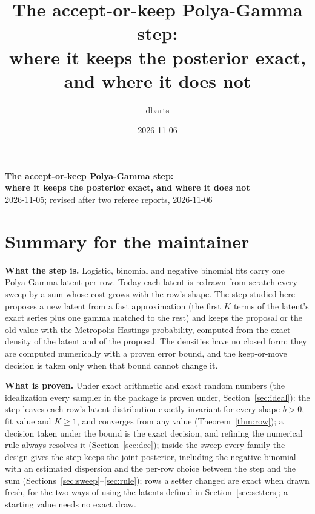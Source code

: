 \documentclass[11pt]{article}
\title{The accept-or-keep Polya-Gamma step:\\ where it keeps the posterior exact, and where it does not}
\author{dbarts}
\date{2026-11-06}
\theoremstyle{definition}
\begin{document}
\begin{center}
{\Large\bfseries The accept-or-keep Polya-Gamma step:\\[2pt] where it keeps the posterior exact, and where it does
not}\\[4pt]
2026-11-05; revised after two referee reports, 2026-11-06
\end{center}

\section*{Summary for the maintainer}

\textbf{What the step is.} Logistic, binomial and negative binomial fits carry one Polya-Gamma latent per row.
Today each latent is redrawn from scratch every sweep by a sum whose cost grows with the row's shape. The step
studied here proposes a new latent from a fast approximation (the first $K$ terms of the latent's exact series
plus one gamma matched to the rest) and keeps the proposal or the old value with the Metropolis-Hastings
probability, computed from the exact density of the latent and of the proposal. The densities have no closed
form; they are computed numerically with a proven error bound, and the keep-or-move decision is taken only when
that bound cannot change it.

\textbf{What is proven.} Under exact arithmetic and exact random numbers (the idealization every sampler in the
package is proven under, Section~\ref{sec:ideal}): the step leaves each row's latent distribution exactly
invariant for every shape $b>0$, fit value and $K\ge1$, and converges from any value (Theorem~\ref{thm:row}); a
decision taken under the bound is the exact decision, and refining the numerical rule always resolves it
(Section~\ref{sec:dec}); inside the sweep every family the design gives the step keeps the joint posterior,
including the negative binomial with an estimated dispersion and the per-row choice between the step and the sum
(Sections~\ref{sec:sweep}--\ref{sec:rule}); rows a setter changed are exact when drawn fresh, for the two ways of
using the latents defined in Section~\ref{sec:setters}; a starting value needs no exact draw.
\end{document}
